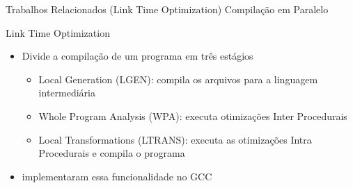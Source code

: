 \begin{frame}{Trabalhos Relacionados (Link Time Optimization)}
    Compilação em Paralelo

    Link Time Optimization    
    \begin{itemize}
        \item Divide a compilação de um programa em três estágios
            \begin{itemize}
                \item Local Generation (LGEN): compila os arquivos para a linguagem intermediária
                \item Whole Program Analysis (WPA): executa otimizações Inter Procedurais
                \item Local Transformations (LTRANS): executa as otimizações Intra Procedurais e compila o programa
            \end{itemize}

        \item \citep{glek2010optimizing} implementaram essa funcionalidade no GCC
    \end{itemize}
\end{frame}

